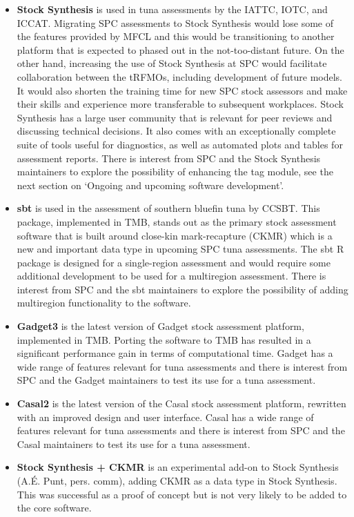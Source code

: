 \documentclass{SCreport}
\begin{document}
\begin{itemize}
  \item \textbf{Stock Synthesis} is used in tuna assessments by the IATTC, IOTC,
  and ICCAT. Migrating SPC assessments to Stock Synthesis would lose some of the
  features provided by MFCL and this would be transitioning to another platform
  that is expected to phased out in the \mbox{not-too-distant} future. On the
  other hand, increasing the use of Stock Synthesis at SPC would facilitate
  collaboration between the tRFMOs, including development of future models. It
  would also shorten the training time for new SPC stock assessors and make
  their skills and experience more transferable to subsequent workplaces. Stock
  Synthesis has a large user community that is relevant for peer reviews and
  discussing technical decisions. It also comes with an exceptionally complete
  suite of tools useful for diagnostics, as well as automated plots and tables
  for assessment reports. There is interest from SPC and the Stock Synthesis
  maintainers to explore the possibility of enhancing the tag module, see
  the next section on `Ongoing and upcoming software development'.
  \item \textbf{sbt} is used in the assessment of southern bluefin tuna by
  CCSBT. This package, implemented in TMB, stands out as the primary stock
  assessment software that is built around close-kin mark-recapture (CKMR) which
  is a new and important data type in upcoming SPC tuna assessments. The
  \textsf{sbt} R package is designed for a single-region assessment and would
  require some additional development to be used for a multiregion assessment.
  There is interest from SPC and the \textsf{sbt} maintainers to explore the
  possibility of adding multiregion functionality to the software.
  \item \textbf{Gadget3} is the latest version of Gadget stock assessment
  platform, implemented in TMB. Porting the software to TMB has resulted in a
  significant performance gain in terms of computational time. Gadget has a wide
  range of features relevant for tuna assessments and there is interest from SPC
  and the Gadget maintainers to test its use for a tuna assessment.
  \item \textbf{Casal2} is the latest version of the Casal stock assessment
  platform, rewritten with an improved design and user interface. Casal has a
  wide range of features relevant for tuna assessments and there is interest
  from SPC and the Casal maintainers to test its use for a tuna assessment.
  \item \textbf{Stock Synthesis + CKMR} is an experimental add-on to Stock
  Synthesis (A.É. Punt, pers. comm), adding CKMR as a data type in Stock
  Synthesis. This was successful as a proof of concept but is not very likely to
  be added to the core software.
\end{itemize}
\end{document}
